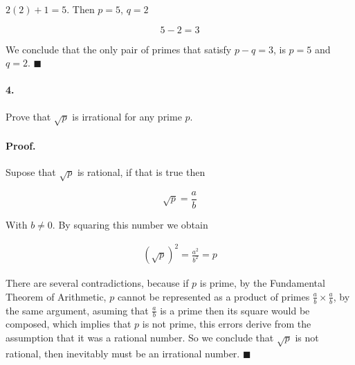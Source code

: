 \documentclass{article}
\begin{document}
$2(2) + 1 = 5$. Then $p=5$, $q=2$

$$5 - 2 = 3$$

We conclude that the only pair of primes that satisfy $p - q =3$, is $p=5$ and $q=2$. $\blacksquare$

\newpage

\paragraph{4.} Prove that $\sqrt{p}$ is irrational for any prime $p$.

\paragraph{Proof.} Supose that $\sqrt{p}$ is rational, if that is true then

$$\sqrt{p} = \frac{a}{b}$$

With $b \neq 0$. By squaring this number we obtain

\begin{align*}
    (\sqrt{p})^2 = \frac{a^2}{b^2} = p
\end{align*}

There are several contradictions, because if $p$ is prime, by the Fundamental Theorem of Arithmetic, $p$ cannot be represented as a product of primes $\frac{a}{b} \times \frac{a}{b}$, by the same argument, asuming that $\frac{a}{b}$ is a prime then its square would be composed, which implies that $p$ is not prime, this errors derive from the assumption that it was a rational number. So we conclude that $\sqrt{p}$ is not rational, then inevitably must be an irrational number. $\blacksquare$
\end{document}
